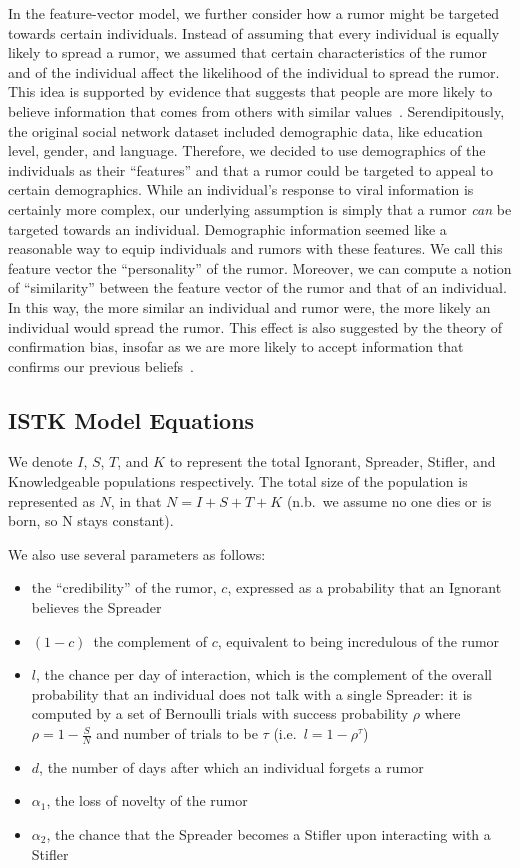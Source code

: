 In the feature-vector model, we further consider how a rumor might be targeted towards certain individuals.
Instead of assuming that every individual is equally likely to spread a rumor, we assumed that certain characteristics of the rumor and of the individual affect the likelihood of the individual to spread the rumor.
This idea is supported by evidence that suggests that people are more likely to believe information that comes from others with similar values~\cite{gillespie-2004}.
Serendipitously, the original social network dataset included demographic data, like education level, gender, and language.
Therefore, we decided to use demographics of the individuals as their ``features'' and that a rumor could be targeted to appeal to certain demographics.
While an individual's response to viral information is certainly more complex, our underlying assumption is simply that a rumor \textit{can} be targeted towards an individual.
Demographic information seemed like a reasonable way to equip individuals and rumors with these features.
We call this feature vector the ``personality'' of the rumor.
Moreover, we can compute a notion of ``similarity'' between the feature vector of the rumor and that of an individual.
In this way, the more similar an individual and rumor were, the more likely an individual would spread the rumor.
This effect is also suggested by the theory of confirmation bias, insofar as we are more likely to accept information that confirms our previous beliefs~\cite{wason-1960}.

\subsection{ISTK Model Equations}
\label{subsec:istkeqns}

We denote $ I $, $ S $, $ T $, and $ K $ to represent the total Ignorant, Spreader, Stifler, and Knowledgeable populations respectively. The total size of the population is represented as $ N $, in that $ N = I + S + T + K $ (n.b.\ we assume no one dies or is born, so N stays constant).

We also use several parameters as follows:
\begin{itemize}
    \item the ``credibility'' of the rumor, $ c $, expressed as a probability that an Ignorant believes the Spreader
    \item $ (1 - c) $\, the complement of $ c $, equivalent to being incredulous of the rumor
    \item $ l $, the chance per day of interaction, which is the complement of the overall probability that an individual does not talk with a single Spreader: it is computed by a set of Bernoulli trials with success probability $ \rho $ where $ \rho = 1 - \frac{S}{N} $ and number of trials to be $ \tau $ (i.e.~$ l = 1 - \rho^\tau $)
    \item $ d $, the number of days after which an individual forgets a rumor
    \item $ \alpha_1 $, the loss of novelty of the rumor
    \item $ \alpha_2 $, the chance that the Spreader becomes a Stifler upon interacting with a Stifler
\end{itemize}

